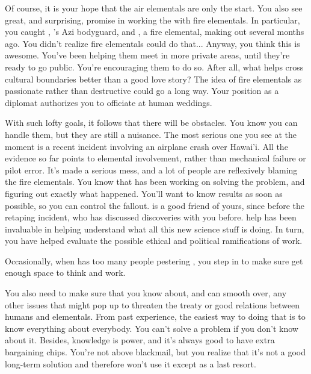 \documentclass[char]{elementals}
\begin{document}
Of course, it is your hope that the air elementals are only the start.  You also see great, and surprising, promise in working the with fire elementals.  In particular, you caught \cRomeo{\intro}, \cLeader{}'s Azi bodyguard, and \cJuliet{\intro}, a fire elemental, making out several months ago.  You didn't realize fire elementals could do that...  Anyway, you think this is awesome.  You've been helping them meet in more private areas, until they're ready to go public.  You're encouraging them to do so.  After all, what helps cross cultural boundaries better than a good love story?  The idea of fire elementals as passionate rather than destructive could go a long way.  Your position as a diplomat authorizes you to officiate at human weddings.

With such lofty goals, it follows that there will be obstacles.  You know you can handle them, but they are still a nuisance.  The most serious one you see at the moment is a recent incident involving an airplane crash over Hawai'i.  All the evidence so far points to elemental involvement, rather than mechanical failure or pilot error.  It's made a serious mess, and a lot of people are reflexively blaming the fire elementals.  You know that \cScientist{\intro} has been working on solving the problem, and figuring out exactly what happened.  You'll want to know \cScientist{\their} results as soon as possible, so you can control the fallout.  \cScientist{} is a good friend of yours, since before the retaping incident, who has discussed \cScientist{\their} discoveries with you before.  \cScientist{\Their} help has been invaluable in helping understand what all this new science stuff is doing.  In turn, you have helped \cScientist{} evaluate the possible ethical and political ramifications of \cScientist{\their} work.

Occasionally, when \cScientist{} has too many people pestering \cScientist{\them}, you step in to make sure \cScientist{\they} get enough space to think and work.


You also need to make sure that you know about, and can smooth over, any other issues that might pop up to threaten the treaty or good relations between humans and elementals.  From past experience, the easiest way to doing that is to know everything about everybody.  You can't solve a problem if you don't know about it.  Besides, knowledge is power, and it's always good to have extra bargaining chips.  You're not above blackmail, but you realize that it's not a good long-term solution and therefore won't use it except as a last resort.
\end{document}
